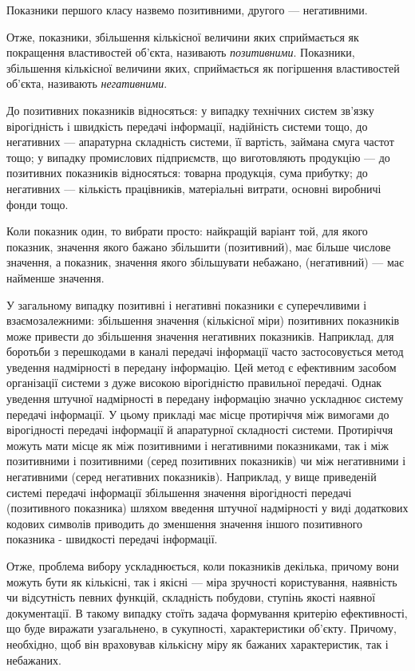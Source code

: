 Показники першого класу назвемо позитивними, другого --- негативними.

Отже, показники, збільшення кількісної величини яких сприймається як покращення властивостей
об’єкта, називають \textit{позитивними}. Показники, збільшення кількісної величини яких,
сприймається як погіршення властивостей об’єкта, називають \textit{негативними}.

До позитивних показників відносяться: у випадку технічних систем зв’язку вірогідність і швидкість
передачі інформації, надійність системи тощо, до негативних --- апаратурна складність системи, її
вартість, займана смуга частот тощо; у випадку промислових підприємств, що виготовляють продукцію
--- до позитивних показників відносяться: товарна продукція, сума прибутку; до негативних ---
кількість працівників, матеріальні витрати, основні виробничі фонди тощо.

Коли показник один, то вибрати просто: найкращій варіант той, для якого показник, значення якого
бажано збільшити (позитивний), має більше числове значення, а показник, значення якого збільшувати
небажано, (негативний) --- має найменше значення.

У загальному випадку позитивні і негативні показники є суперечливими і взаємозалежними: збільшення
значення (кількісної міри) позитивних показників може привести до збільшення значення негативних
показників.  Наприклад, для боротьби з перешкодами в каналі передачі інформації часто застосовується
метод уведення надмірності в передану інформацію. Цей метод є ефективним засобом організації системи
з дуже високою вірогідністю правильної передачі. Однак уведення штучної надмірності в передану
інформацію значно ускладнює систему передачі інформації. У цьому прикладі має місце протиріччя між
вимогами до вірогідності передачі інформації й апаратурної складності системи. Протиріччя можуть
мати місце як між позитивними і негативними показниками, так і між позитивними і позитивними (серед
позитивних показників) чи між негативними і негативними (серед негативних показників). Наприклад, у
вище приведеній системі передачі інформації збільшення значення вірогідності передачі (позитивного
показника) шляхом введення штучної надмірності у виді додаткових кодових символів приводить до
зменшення значення іншого позитивного показника - швидкості передачі інформації.

Отже, проблема вибору ускладнюється, коли показників декілька, причому вони можуть бути як
кількісні, так і якісні --- міра зручності користування, наявність чи відсутність певних функцій,
складність побудови, ступінь якості наявної документації. В такому випадку стоїть задача формування
критерію ефективності, що буде виражати узагальнено, в сукупності, характеристики об’єкту. Причому,
необхідно, щоб він враховував кількісну міру як бажаних характеристик, так і небажаних.

